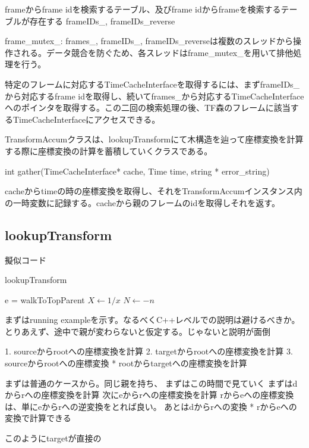 \documentclass{jarticle}
\begin{document}
\begin{multicols}{2}
frameからframe idを検索するテーブル、及びframe idからframeを検索するテーブルが存在する frameIDs\_, frameIDs\_reverse

frame\_mutex\_: frames\_, frameIDs\_, frameIDs\_reverseは複数のスレッドから操作される。データ競合を防ぐため、各スレッドはframe\_mutex\_を用いて排他処理を行う。


特定のフレームに対応するTimeCacheInterfaceを取得するには、まずframeIDs\_から対応するframe idを取得し、続いてframes\_から対応するTimeCacheInterfaceへのポインタを取得する。この二回の検索処理の後、TF森のフレームに該当するTimeCacheInterfaceにアクセスできる。

TransformAccumクラスは、lookupTransformにて木構造を辿って座標変換を計算する際に座標変換の計算を蓄積していくクラスである。

int gather(TimeCacheInterface* cache, Time time, string * error\_string)

cacheからtimeの時の座標変換を取得し、それをTransformAccumインスタンス内の一時変数に記録する。cacheから親のフレームのidを取得しそれを返す。	


\subsection{lookupTransform}

擬似コード

\begin{algorithm}[H]
	\caption{lookupTransform}
	\begin{algorithmic}
	\STATE e = walkToTopParent
	\STATE $X \leftarrow 1 / x$
    \STATE $N \leftarrow -n$
    \ENDIF
	\end{algorithmic}
\end{algorithm}


まずはrunning exampleを示す。なるべくC++レベルでの説明は避けるべきか。
とりあえず、途中で親が変わらないと仮定する。じゃないと説明が面倒

1. sourceからrootへの座標変換を計算
2. targetからrootへの座標変換を計算
3. sourceからrootへの座標変換 * rootからtargetへの座標変換を計算

まずは普通のケースから。同じ親を持ち、
%
まずはこの時間で見ていく
まずはdからrへの座標変換を計算
次にeからrへの座標変換を計算
rからeへの座標変換は、単にeからrへの逆変換をとれば良い。
あとはdからrへの変換 * rからeへの変換で計算できる


このようにtargetが直接の


\end{multicols}
\end{document}
